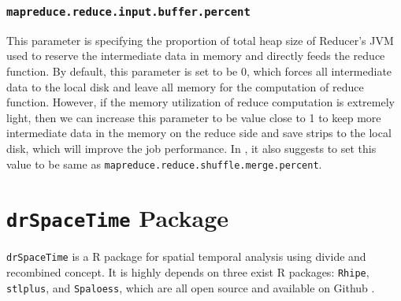 \subsubsection{\texttt{mapreduce.reduce.input.buffer.percent}}

This parameter is specifying the proportion of total heap size of Reducer's JVM
used to reserve the intermediate data in memory and directly feeds the reduce
function. By default, this parameter is set to be 0, which forces all intermediate
data to the local disk and leave all memory for the computation of reduce function.
However, if the memory utilization of reduce computation is extremely light, then
we can increase this parameter to be value close to 1 to keep more intermediate
data in the memory on the reduce side and save strips to the local disk, which
will improve the job performance. In \cite{li2014mronline}, it also suggests to
set this value to be same as \texttt{mapreduce.reduce.shuffle.merge.percent}. 


\section{\texttt{drSpaceTime} Package}

\texttt{drSpaceTime} is a R package for spatial temporal analysis using divide 
and recombined concept. It is highly depends on three exist R packages: 
\texttt{Rhipe}, \texttt{stlplus}, and \texttt{Spaloess}, which are all open 
source and available on Github \cite{github}.
